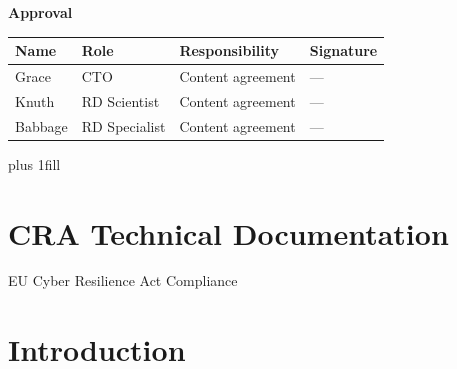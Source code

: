 \documentclass[
  11 pt,
  a4paper,
  table]{report}
\renewcommand*\contentsname{Table of contents}
\newcommand\contentsname{Table of contents}
\renewcommand*\listfigurename{List of Figures}
\newcommand\listfigurename{List of Figures}
\renewcommand*\listtablename{List of Tables}
\newcommand\listtablename{List of Tables}
\begin{document}
\begin{flushleft}
    \textcolor{AlabRed}{\textbf{Approval}}\\
\end{flushleft}
\vspace{1ex}

\begin{tabular}{ | p{}| p{}| p{}| p{}| } %
    \hline
    \rowcolor{AlabTableColLightBlue}
    \textbf{Name} & \textbf{Role} & \textbf{Responsibility} & \textbf{Signature} \\
    \hline
    Grace & CTO & Content agreement & --- \\ \hline Knuth & RD Scientist & Content agreement & --- \\ \hline Babbage & RD Specialist & Content agreement & --- \\  
    \hline
\end{tabular} %
\vspace{1ex}
\hbox{}\vskip 0cm plus 1fill
\pagebreak

\renewcommand*\contentsname{Table of contents}
{
\hypersetup{linkcolor=}
\setcounter{tocdepth}{2}
\tableofcontents
}
\listoffigures
\listoftables


\chapter{CRA Technical Documentation}\label{cra-technical-documentation}

EU Cyber Resilience Act Compliance

\hfill\break


\chapter*{Introduction}\label{introduction}
\end{document}

